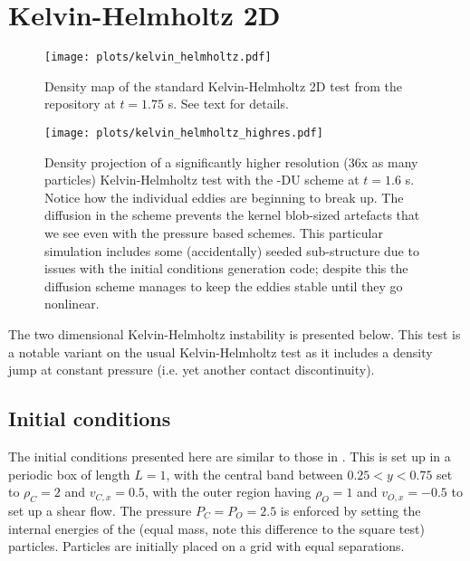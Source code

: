 \section{Kelvin-Helmholtz 2D}
\label{sec:kelvinhelmholtz}

\begin{figure*}
    \centering
    \texttt{[image: plots/kelvin\_helmholtz.pdf]}
    \vspace{-0.5cm}
    \caption{Density map of the standard Kelvin-Helmholtz 2D test from the
    \swift{} repository at $t=1.75$ s. See text for details.}
    \label{fig:kelvinhelmholtz}
\end{figure*}

\begin{figure*}
    \centering
    \texttt{[image: plots/kelvin\_helmholtz\_highres.pdf]}
    \vspace{-0.5cm}
    \caption{Density projection of a significantly higher resolution (36x as
    many particles) Kelvin-Helmholtz test with the \anarchy{}-DU scheme at
    $t=1.6$ s. Notice how the individual eddies are beginning to break up.
    The diffusion in the scheme prevents the kernel blob-sized artefacts that
    we see even with the pressure based schemes. This particular simulation
    includes some (accidentally) seeded sub-structure due to issues with the
    initial conditions generation code; despite this the diffusion scheme
    manages to keep the eddies stable until they go nonlinear.}
    \label{fig:khhighres}
\end{figure*}

The two dimensional Kelvin-Helmholtz instability is presented below. This test
is a notable variant on the usual Kelvin-Helmholtz test as it includes a
density jump at constant pressure (i.e. yet another contact discontinuity).

\subsection{Initial conditions}

The initial conditions presented here are similar to those in \citet{Price2008}.
This is set up in a periodic box of length $L=1$, with the central band between
$0.25 < y < 0.75$ set to $\rho_C = 2$ and $v_{C, x} = 0.5$, with the outer
region having $\rho_O = 1$ and $v_{O, x} = -0.5$ to set up a shear flow. The pressure
$P_C = P_O = 2.5$ is enforced by setting the internal energies of the (equal mass,
note this difference to the square test) particles. Particles are initially placed
on a grid with equal separations.

